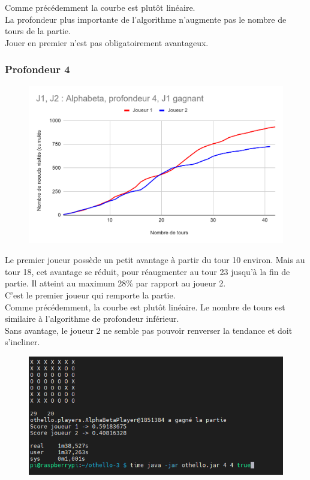 \documentclass[12pt]{article}
\begin{document}
Comme précédemment la courbe est plutôt linéaire.\\
La profondeur plus importante de l'algorithme n'augmente pas le nombre de tours de la partie.\\
Jouer en premier n'est pas obligatoirement avantageux.
\newpage
\subsubsection{Profondeur 4}

\begin{figure}[!h]
   \includegraphics[width=\textwidth]{prof4alphabeta.png}
\end{figure}

Le premier joueur possède un petit avantage à partir du tour 10 environ. Mais au tour 18, cet avantage se réduit, pour réaugmenter au tour 23 jusqu'à la fin de partie. Il atteint au maximum 28\% par rapport au joueur 2.\\
C'est le premier joueur qui remporte la partie.\\

Comme précédemment, la courbe est plutôt linéaire. Le nombre de tours est similaire à l'algorithme de profondeur inférieur.\\
Sans avantage, le joueur 2 ne semble pas pouvoir renverser la tendance et doit s'incliner.
\newpage
\begin{figure}[!h]
   \includegraphics[width=\textwidth]{prof4alphabeta-console.png}
\end{figure}
\end{document}
